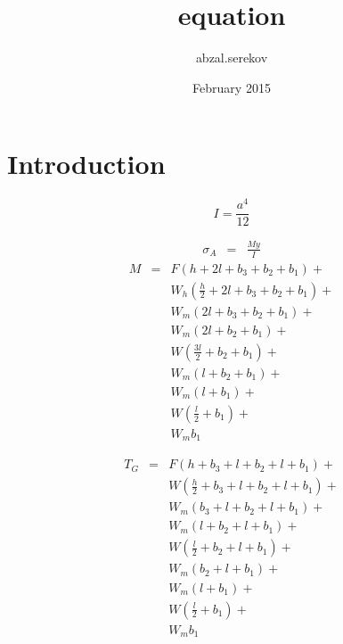 \documentclass{article}[12pt]
\title{equation}
\author{abzal.serekov }
\date{February 2015}
\begin{document}
\maketitle

\section{Introduction}

\begin{equation}
I =\displaystyle\frac{a^4}{12}
\end{equation}


\begin{equation}
    \begin{array}{rcl}
          \displaystyle\sigma_A & = & \displaystyle\frac{My}{I} 
    \end{array}
\end{equation}
\begin{equation}
    \begin{array}{rcl}
                M &= &F (h + 2l + b_3 + b_2 + b_1)  +\\
                 & & W_h \left(\displaystyle\frac{h}{2}+ 2l + b_3 + b_2 + b_1\right) + \\
                 & & W_m (2l + b_3 + b_2 + b_1) + \\
                 & & W_m (2l + b_2 + b_1)+ \\
                 & & W \left(\displaystyle\frac{3l}{2} + b_2 + b_1\right)+  \\
                 & & W_m (l + b_2 + b_1) + \\
                 & & W_m (l + b_1) + \\
                 & & W \left(\displaystyle\frac{l}{2} + b_1\right) + \\
                 & & W_m b_1
   

    \end{array}
\end{equation}

\begin{equation}
    \begin{array}{rcl}
T_G& =& F  (h + b_3 + l + b_2 + l + b_1) + \\
&&	 W  \left(\displaystyle\frac{h}{2} + b_3 + l + b_2 + l + b_1\right) + \\
&&	 W_m  (b_3 + l + b_2 + l + b_1) + \\
&&	 W_m (l + b_2 + l + b_1) + \\
&&	 W  \left(\displaystyle\frac{l}{2} + b_2 + l + b_1\right) + \\
&&	 W_m  (b_2 + l + b_1) + \\
&&	 W_m  (l + b_1) + \\
&&	 W  \left(\displaystyle\frac{l}{2} + b_1\right) + \\
&&	 W_m b_1
    \end{array}
\end{equation}
\end{document}
